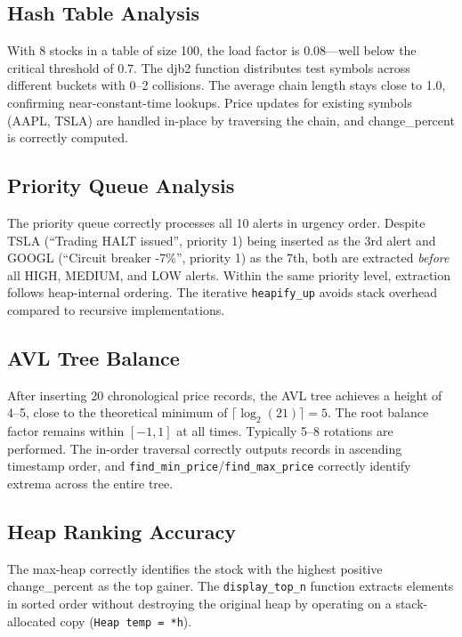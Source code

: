 \documentclass[conference]{IEEEtran}
\begin{document}
\subsection{Hash Table Analysis}

With 8 stocks in a table of size 100, the load factor is 0.08---well below the critical threshold of 0.7. The djb2 function distributes test symbols across different buckets with 0--2 collisions. The average chain length stays close to 1.0, confirming near-constant-time lookups. Price updates for existing symbols (AAPL, TSLA) are handled in-place by traversing the chain, and change\_percent is correctly computed.

\subsection{Priority Queue Analysis}

The priority queue correctly processes all 10 alerts in urgency order. Despite TSLA (``Trading HALT issued'', priority 1) being inserted as the 3rd alert and GOOGL (``Circuit breaker -7\%'', priority 1) as the 7th, both are extracted \emph{before} all HIGH, MEDIUM, and LOW alerts. Within the same priority level, extraction follows heap-internal ordering. The iterative \texttt{heapify\_up} avoids stack overhead compared to recursive implementations.

\subsection{AVL Tree Balance}

After inserting 20 chronological price records, the AVL tree achieves a height of 4--5, close to the theoretical minimum of $\lceil\log_2(21)\rceil = 5$. The root balance factor remains within $[-1, 1]$ at all times. Typically 5--8 rotations are performed. The in-order traversal correctly outputs records in ascending timestamp order, and \texttt{find\_min\_price}/\texttt{find\_max\_price} correctly identify extrema across the entire tree.

\subsection{Heap Ranking Accuracy}

The max-heap correctly identifies the stock with the highest positive change\_percent as the top gainer. The \texttt{display\_top\_n} function extracts elements in sorted order without destroying the original heap by operating on a stack-allocated copy (\texttt{Heap temp = *h}).
\end{document}
